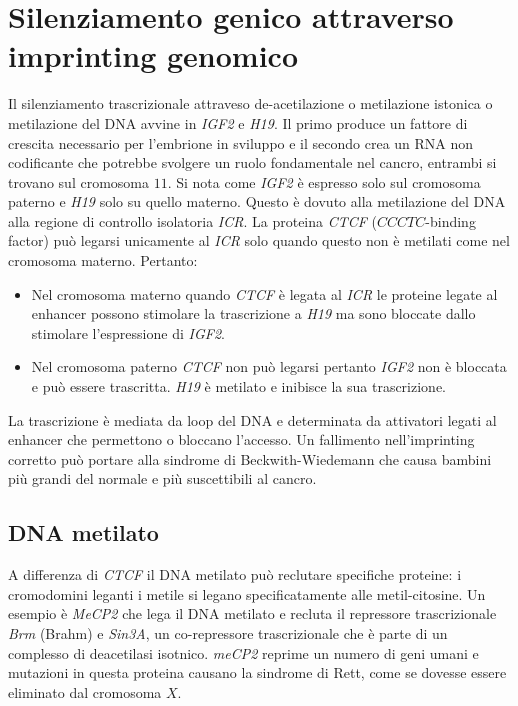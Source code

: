 \section{Silenziamento genico attraverso imprinting genomico}
Il silenziamento trascrizionale attraveso de-acetilazione o metilazione istonica o metilazione del DNA avvine in \emph{IGF2} e \emph{H19}. Il primo produce un fattore di crescita 
necessario per l'embrione in sviluppo e il secondo crea un RNA non codificante che potrebbe svolgere un ruolo fondamentale nel cancro, entrambi si trovano sul cromosoma $11$. Si nota
come \emph{IGF2} \`e espresso solo sul cromosoma paterno e \emph{H19} solo su quello materno. Questo \`e dovuto alla metilazione del DNA alla regione di controllo isolatoria \emph{ICR}. 
La proteina \emph{CTCF} ($CCCTC$-binding factor) pu\`o legarsi unicamente al \emph{ICR} solo quando questo non \`e metilati come nel cromosoma materno. Pertanto:
\begin{itemize}
	\item Nel cromosoma materno quando \emph{CTCF} \`e legata al \emph{ICR} le proteine legate al enhancer possono stimolare la trascrizione a \emph{H19} ma sono bloccate
		dallo stimolare l'espressione di \emph{IGF2}.
	\item Nel cromosoma paterno \emph{CTCF} non pu\`o legarsi pertanto \emph{IGF2} non \`e bloccata e pu\`o essere trascritta. \emph{H19} \`e metilato e inibisce la sua trascrizione.
\end{itemize}
La trascrizione \`e mediata da loop del DNA e determinata da attivatori legati al enhancer che permettono o bloccano l'accesso. Un fallimento nell'imprinting corretto pu\`o portare alla
sindrome di Beckwith-Wiedemann che causa bambini pi\`u grandi del normale e pi\`u suscettibili al cancro. 
\subsection{DNA metilato}
A differenza di \emph{CTCF} il DNA metilato pu\`o reclutare specifiche proteine: i cromodomini leganti i metile si legano specificatamente alle metil-citosine. Un esempio \`e 
\emph{MeCP2} che lega il DNA metilato e recluta il repressore trascrizionale \emph{Brm} (Brahm) e \emph{Sin3A}, un co-repressore trascrizionale che \`e parte di un complesso di 
deacetilasi isotnico. \emph{meCP2} reprime un numero di geni umani e mutazioni in questa proteina causano la sindrome di Rett, come se dovesse essere eliminato dal cromosoma $X$.
